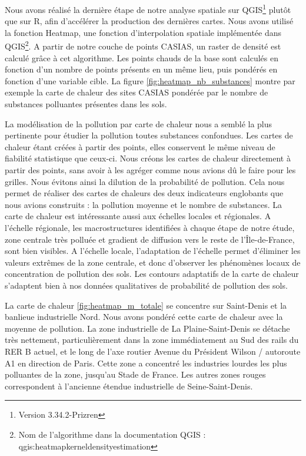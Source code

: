 \documentclass[a4paper,twoside,12pt]{book}
\begin{document}
Nous avons réalisé la dernière étape de notre analyse spatiale sur QGIS\footnote{Version 3.34.2-Prizren} plutôt que sur R, afin d'accélérer la production des dernières cartes. Nous avons utilisé la fonction Heatmap, une fonction d'interpolation spatiale implémentée dans QGIS\footnote{Nom de l'algorithme dans la documentation QGIS : qgis:heatmapkerneldensityestimation }. A partir de notre couche de points CASIAS, un raster de densité est calculé grâce à cet algorithme. Les points chauds de la base sont calculés en fonction d'un nombre de points présents en un même lieu, puis pondérés en fonction d'une variable cible. La figure \ref{fig:heatmap_nb_substances} montre par exemple la carte de chaleur des sites CASIAS pondérée par le nombre de substances polluantes présentes dans les sols. 

La modélisation de la pollution par carte de chaleur nous a semblé la plus pertinente pour étudier la pollution toutes substances confondues. Les cartes de chaleur étant créées à partir des points, elles conservent le même niveau de fiabilité statistique que ceux-ci. Nous créons les cartes de chaleur directement à partir des points, sans avoir à les agréger comme nous avions dû le faire pour les grilles. Nous évitons ainsi la dilution de la probabilité de pollution. Cela nous permet de réaliser des cartes de chaleurs des deux indicateurs englobants que nous avions construits : la pollution moyenne et le nombre de substances. La carte de chaleur est intéressante aussi aux échelles locales et régionales. A l'échelle régionale, les macrostructures identifiées à chaque étape de notre étude, zone centrale très polluée et gradient de diffusion vers le reste de l'Île-de-France, sont bien visibles. A l'échelle locale, l'adaptation de l'échelle permet d'éliminer les valeurs extrêmes de la zone centrale, et donc d'observer les phénomènes locaux de concentration de pollution des sols. Les contours adaptatifs de la carte de chaleur s'adaptent bien à nos données qualitatives de probabilité de pollution des sols. 

La carte de chaleur \ref{fig:heatmap_m_totale} se concentre sur Saint-Denis et la banlieue industrielle Nord. Nous avons pondéré cette carte de chaleur avec la moyenne de pollution. La zone industrielle de La Plaine-Saint-Denis se détache très nettement, particulièrement dans la zone immédiatement au Sud des rails du RER B actuel, et le long de l'axe routier Avenue du Président Wilson / autoroute A1 en direction de Paris.  Cette zone a concentré les industries lourdes les plus polluantes de la zone, jusqu'au Stade de France. Les autres zones rouges correspondent à l'ancienne étendue industrielle de Seine-Saint-Denis. 
\end{document}
